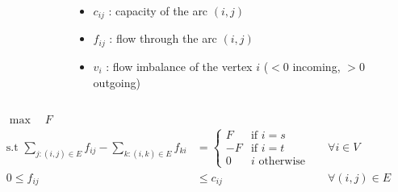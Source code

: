 \begin{frame}[fragile]
\begin{columns}
\begin{column}{0.45\textwidth}
\begin{figure}
	\end{figure}
	\end{column}
	\begin{column}{0.55\textwidth}
  \begin{itemize}
    \item $c_{ij}$ : capacity of the arc $(i,j)$
    \item $f_{ij}$ : flow through the arc $(i,j)$
    \item $v_i$ : flow imbalance of the vertex $i$ ($<0$ incoming, $>0$ outgoing)
    \end{itemize}
	\end{column}
	\end{columns}
	\begin{align*}
    \max\quad F \qquad\qquad\qquad\qquad&\\
    \text{s.t } \sum_{j:(i,j)\in
    E}f_{ij}-\sum_{k:(i,k)\in E}f_{ki}&=
                                        \begin{cases}
                                          F& \text{if } i=s\\
                                          -F& \text{if } i=t\\
                                          0& i \text{ otherwise}
                                        \end{cases}
                                      && \forall i\in V\\
    0\le f_{ij}&\le c_{ij} &&\forall (i,j)\in E
  \end{align*}
	\end{frame}

